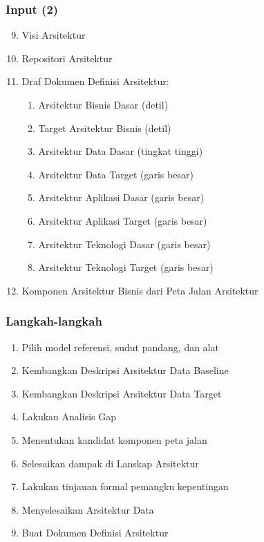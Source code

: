 \documentclass[aspectratio=169, table]{beamer}
\begin{document}
	\begin{frame}
		\frametitle{Input (2)}
			\vspace{20pt}
					\begin{enumerate}
						\setcounter{enumi}{8}
						\item Visi Arsitektur
						\item Repositori Arsitektur
						\item Draf Dokumen Definisi Arsitektur:
						\begin{enumerate}
							\item Arsitektur Bisnis Dasar (detil)
							\item Target Arsitektur Bisnis (detil)
							\item Arsitektur Data Dasar (tingkat tinggi)
							\item Arsitektur Data Target (garis besar)
							\item Arsitektur Aplikasi Dasar (garis besar)
							\item Arsitektur Aplikasi Target (garis besar)
							\item Arsitektur Teknologi Dasar (garis besar)
							\item Arsitektur Teknologi Target (garis besar)
						\end{enumerate}
						\item Komponen Arsitektur Bisnis dari Peta Jalan Arsitektur
					\end{enumerate}
	\end{frame}


	\begin{frame}
		\frametitle{Langkah-langkah}
        \vspace{20pt}
		\begin{enumerate}
			\item Pilih model referensi, sudut pandang, dan alat
			\item Kembangkan Deskripsi Arsitektur Data Baseline
			\item Kembangkan Deskripsi Arsitektur Data Target
			\item Lakukan Analisis Gap
			\item Menentukan kandidat komponen peta jalan
			\item Selesaikan dampak di Lanskap Arsitektur
			\item Lakukan tinjauan formal pemangku kepentingan
			\item Menyelesaikan Arsitektur Data
			\item Buat Dokumen Definisi Arsitektur
		\end{enumerate}
	\end{frame}
\end{document}
